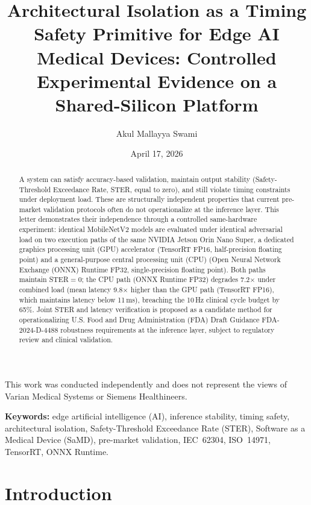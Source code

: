 \documentclass[11pt]{article}
\title{Architectural Isolation as a Timing Safety Primitive for Edge AI Medical Devices: Controlled Experimental Evidence on a Shared-Silicon Platform}
\author[1]{Akul Mallayya Swami}
\affil[1]{Varian Medical Systems, A Siemens Healthineers Company, Palo Alto, CA 94304 USA\\
Email: \texttt{swami.akul@alumni.uml.edu}\\
ORCID: 0009-0003-9549-5543}
\date{April 17, 2026}
\begin{document}
\maketitle

\begin{center}
\small
This work was conducted independently and does not represent the views of
Varian Medical Systems or Siemens Healthineers.
\end{center}

\begin{abstract}
A system can satisfy accuracy-based validation, maintain output stability
(Safety-Threshold Exceedance Rate, STER, equal to zero), and still violate timing
constraints under deployment load. These are structurally independent properties that current
pre-market validation protocols often do not operationalize at the inference layer. This letter demonstrates their independence
through a controlled same-hardware experiment: identical MobileNetV2 models are
evaluated under identical adversarial load on two execution paths of the same NVIDIA
Jetson Orin Nano Super, a dedicated graphics processing unit (GPU) accelerator
(TensorRT FP16, half-precision floating point) and a general-purpose central processing
unit (CPU) (Open Neural Network Exchange (ONNX) Runtime FP32, single-precision
floating point). Both paths maintain STER$=0$; the CPU path (ONNX Runtime FP32) degrades 7.2$\times$
under combined load (mean latency 9.8$\times$ higher than the GPU path (TensorRT FP16),
which maintains latency below 11\,ms), breaching the 10\,Hz clinical cycle budget by 65\%. Joint STER
and latency verification is proposed as a candidate method for operationalizing
U.S. Food and Drug Administration (FDA) Draft Guidance FDA-2024-D-4488 robustness
requirements at the inference layer, subject to regulatory review and clinical validation.
\end{abstract}

\noindent\textbf{Keywords:} edge artificial intelligence (AI), inference stability, timing safety, architectural isolation, Safety-Threshold Exceedance Rate (STER), Software as a Medical Device (SaMD), pre-market validation, IEC~62304, ISO~14971, TensorRT, ONNX Runtime.

\section{Introduction}
\end{document}
